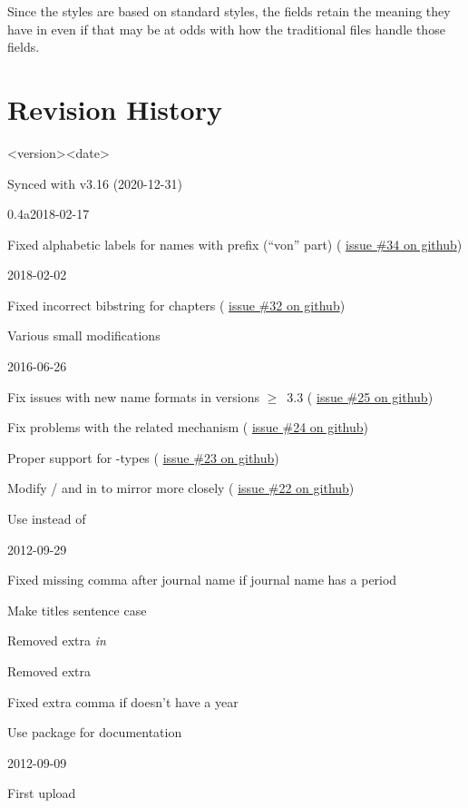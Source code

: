 \documentclass{ltxdockit}[2011/03/25]
\newcommand*{\gitissuelink}[1]{%
  \href{https://github.com/moewew/biblatex-trad/issues/#1}{issue \##1 on github}}
\begin{document}
Since the styles are based on  standard styles, the fields retain the meaning
they have in  even if that may be at odds with how the traditional 
files handle those fields.


\section{Revision History}\label{apx:log}
\begin{changelog}
\begin{release}{<version>}{<date>}
\item Synced with  v3.16 (2020-12-31)
\end{release}

\begin{release}{0.4a}{2018-02-17}
\item Fixed alphabetic labels for names with prefix (\enquote{von} part) (\gitissuelink{34})
\end{release}

\begin{release}{0.4}{2018-02-02}
\item Fixed incorrect bibstring for chapters (\gitissuelink{32})
\item Various small modifications
\end{release}

\begin{release}{0.3}{2016-06-26}
\item Fix issues with new name formats in  versions $\geq$~3.3 (\gitissuelink{25})
\item Fix problems with the related mechanism (\gitissuelink{24})
\item Proper support for -types (\gitissuelink{23})
\item Modify / and  in  to mirror  more closely (\gitissuelink{22})
\item Use  instead of 
\end{release}

\begin{release}{0.2}{2012-09-29}
\item Fixed missing comma after journal name if journal name has a period
\item Make titles sentence case
\item Removed extra \emph{in}
\item Removed extra 
\item Fixed extra comma if  doesn't have a year
\item Use package  for documentation
\end{release}

\begin{release}{0.1}{2012-09-09}
\item First upload
\end{release}
\end{changelog}
\end{document}
